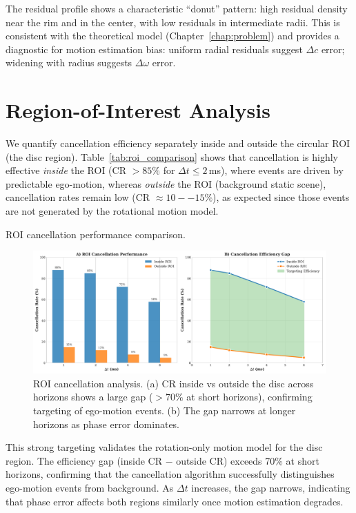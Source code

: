 The residual profile shows a characteristic ``donut'' pattern: high residual density near the rim and in the center, with low residuals in intermediate radii. This is consistent with the theoretical model (Chapter~\ref{chap:problem}) and provides a diagnostic for motion estimation bias: uniform radial residuals suggest $\Delta c$ error; widening with radius suggests $\Delta\omega$ error.

\section{Region-of-Interest Analysis}

We quantify cancellation efficiency separately inside and outside the circular ROI (the disc region). Table~\ref{tab:roi_comparison} shows that cancellation is highly effective \emph{inside} the ROI (CR $> 85\%$ for $\Delta t \leq 2$\,ms), where events are driven by predictable ego-motion, whereas \emph{outside} the ROI (background static scene), cancellation rates remain low (CR $\approx 10--15\%$), as expected since those events are not generated by the rotational motion model.

\begin{table}[t]
  \centering
  \caption{ROI cancellation performance comparison.}
  \label{tab:roi_comparison}
  
\end{table}

\begin{figure}[t]
  \centering
  \includegraphics[width=0.85\linewidth]{../code/thesis_figures/figure_roi_analysis.pdf}
\caption{ROI cancellation analysis. (a) CR inside vs outside the disc across horizons shows a large gap ($>70\%$ at short horizons), confirming targeting of ego-motion events. (b) The gap narrows at longer horizons as phase error dominates.}
  \label{fig:roi_comparison}
\end{figure}

This strong targeting validates the rotation-only motion model for the disc region. The efficiency gap (inside CR $-$ outside CR) exceeds 70\% at short horizons, confirming that the cancellation algorithm successfully distinguishes ego-motion events from background. As $\Delta t$ increases, the gap narrows, indicating that phase error affects both regions similarly once motion estimation degrades.

